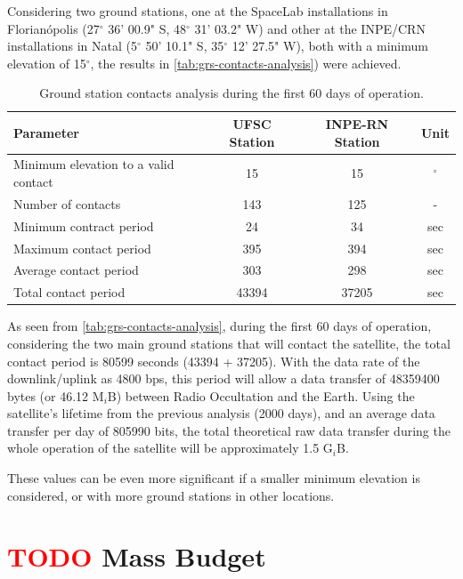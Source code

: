 Considering two ground stations, one at the SpaceLab installations in Florianópolis (27$^{\circ}$ 36' 00.9" S, 48$^{\circ}$ 31' 03.2" W) and other at the INPE/CRN installations in Natal (5$^{\circ}$ 50' 10.1" S, 35$^{\circ}$ 12' 27.5" W), both with a minimum elevation of 15$^{\circ}$, the results in \autoref{tab:grs-contacts-analysis}) were achieved. %

\begin{table}[!h]
    \centering
    \begin{tabular}{lccc}
        \toprule[1.5pt]
        \textbf{Parameter} & \textbf{UFSC Station} & \textbf{INPE-RN Station} & \textbf{Unit} \\
        \midrule
        Minimum elevation to a valid contact    & 15    & 15    & $^{\circ}$ \\
        Number of contacts                      & 143   & 125   & - \\
        Minimum contract period                  & 24    & 34    & sec \\
        Maximum contact period                  & 395   & 394   & sec \\
        Average contact period                  & 303   & 298   & sec \\
        Total contact period                    & 43394 & 37205 & sec \\
        \bottomrule[1.5pt]
    \end{tabular}
    \caption{Ground station contacts analysis during the first 60 days of operation.}
    \label{tab:grs-contacts-analysis}
\end{table}

As seen from \autoref{tab:grs-contacts-analysis}, during the first 60 days of operation, considering the two main ground stations that will contact the satellite, the total contact period is 80599 seconds (43394 + 37205). With the data rate of the downlink/uplink as 4800 bps, this period will allow a data transfer of 48359400 bytes (or 46.12 M$_{i}$B) between Radio Occultation and the Earth. Using the satellite's lifetime from the previous analysis (2000 days), and an average data transfer per day of 805990 bits, the total theoretical raw data transfer during the whole operation of the satellite will be approximately 1.5 G$_{i}$B.

These values can be even more significant if a smaller minimum elevation is considered, or with more ground stations in other locations.

\section{ \textcolor{red}{TODO} Mass Budget} \label{mass-budget}

